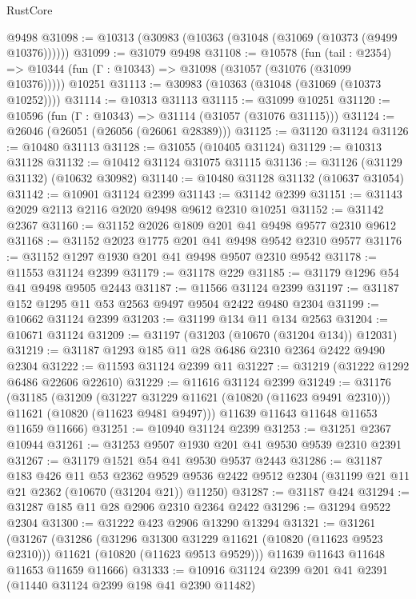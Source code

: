 \begin{lexlean}{RustCore}
\begin{coremodule}
    @9498
@31098 := @10313 (@30983 (@10363 (@31048 (@31069 (@10373 (@9499 @10376))))))
@31099 := @31079 @9498
@31108 := @10578
    (fun (tail : @2354) => @10344 (fun (Γ : @10343) => @31098 (@31057 (@31076 (@31099 @10376)))))
    @10251
@31113 := @30983 (@10363 (@31048 (@31069 (@10373 @10252))))
@31114 := @10313 @31113
@31115 := @31099 @10251
@31120 := @10596 (fun (Γ : @10343) => @31114 (@31057 (@31076 @31115)))
@31124 := @26046 (@26051 (@26056 (@26061 @28389)))
@31125 := @31120 @31124
@31126 := @10480 @31113
@31128 := @31055 (@10405 @31124)
@31129 := @10313 @31128
@31132 := @10412 @31124 @31075 @31115
@31136 := @31126 (@31129 @31132) (@10632 @30982)
@31140 := @10480 @31128 @31132 (@10637 @31054)
@31142 := @10901 @31124 @2399
@31143 := @31142 @2399
@31151 := @31143 @2029 @2113 @2116 @2020 @9498 @9612 @2310 @10251
@31152 := @31142 @2367
@31160 := @31152 @2026 @1809 @201 @41 @9498 @9577 @2310 @9612
@31168 := @31152 @2023 @1775 @201 @41 @9498 @9542 @2310 @9577
@31176 := @31152 @1297 @1930 @201 @41 @9498 @9507 @2310 @9542
@31178 := @11553 @31124 @2399
@31179 := @31178 @229
@31185 := @31179 @1296 @54 @41 @9498 @9505 @2443
@31187 := @11566 @31124 @2399
@31197 := @31187 @152 @1295 @11 @53 @2563 @9497 @9504 @2422 @9480 @2304
@31199 := @10662 @31124 @2399
@31203 := @31199 @134 @11 @134 @2563
@31204 := @10671 @31124
@31209 := @31197 (@31203 (@10670 (@31204 @134)) @12031)
@31219 := @31187 @1293 @185 @11 @28 @6486 @2310 @2364 @2422 @9490 @2304
@31222 := @11593 @31124 @2399 @11
@31227 := @31219 (@31222 @1292 @6486 @22606 @22610)
@31229 := @11616 @31124 @2399
@31249 := @31176
    (@31185
      (@31209
        (@31227 @31229 @11621 (@10820 (@11623 @9491 @2310)))
        @11621
        (@10820 (@11623 @9481 @9497)))
      @11639
      @11643
      @11648
      @11653
      @11659
      @11666)
@31251 := @10940 @31124 @2399
@31253 := @31251 @2367 @10944
@31261 := @31253 @9507 @1930 @201 @41 @9530 @9539 @2310 @2391
@31267 := @31179 @1521 @54 @41 @9530 @9537 @2443
@31286 := @31187
    @183
    @426
    @11
    @53
    @2362
    @9529
    @9536
    @2422
    @9512
    @2304
    (@31199 @21 @11 @21 @2362 (@10670 (@31204 @21)) @11250)
@31287 := @31187 @424
@31294 := @31287 @185 @11 @28 @2906 @2310 @2364 @2422
@31296 := @31294 @9522 @2304
@31300 := @31222 @423 @2906 @13290 @13294
@31321 := @31261
    (@31267
      (@31286
        (@31296 @31300 @31229 @11621 (@10820 (@11623 @9523 @2310)))
        @11621
        (@10820 (@11623 @9513 @9529)))
      @11639
      @11643
      @11648
      @11653
      @11659
      @11666)
@31333 := @10916 @31124 @2399 @201 @41 @2391 (@11440 @31124 @2399 @198 @41 @2390 @11482)

\end{coremodule}
\end{lexlean}
